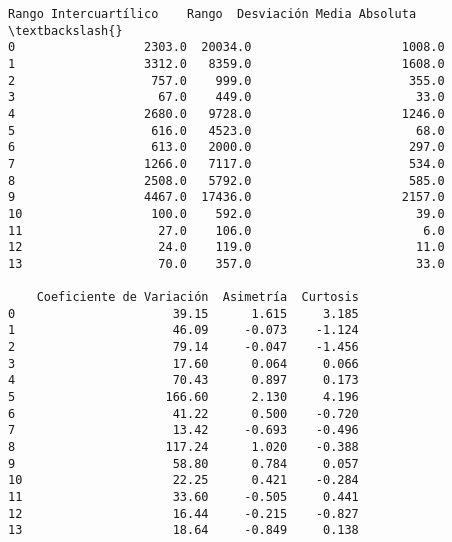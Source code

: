 \documentclass[11pt]{article}
\begin{document}
\begin{tcolorbox}[breakable, size=fbox, boxrule=.5pt, pad at break*=1mm, opacityfill=0]
\begin{Verbatim}[commandchars=\\\{\}]
    Rango Intercuartílico    Rango  Desviación Media Absoluta  \textbackslash{}
0                  2303.0  20034.0                     1008.0
1                  3312.0   8359.0                     1608.0
2                   757.0    999.0                      355.0
3                    67.0    449.0                       33.0
4                  2680.0   9728.0                     1246.0
5                   616.0   4523.0                       68.0
6                   613.0   2000.0                      297.0
7                  1266.0   7117.0                      534.0
8                  2508.0   5792.0                      585.0
9                  4467.0  17436.0                     2157.0
10                  100.0    592.0                       39.0
11                   27.0    106.0                        6.0
12                   24.0    119.0                       11.0
13                   70.0    357.0                       33.0

    Coeficiente de Variación  Asimetría  Curtosis
0                      39.15      1.615     3.185
1                      46.09     -0.073    -1.124
2                      79.14     -0.047    -1.456
3                      17.60      0.064     0.066
4                      70.43      0.897     0.173
5                     166.60      2.130     4.196
6                      41.22      0.500    -0.720
7                      13.42     -0.693    -0.496
8                     117.24      1.020    -0.388
9                      58.80      0.784     0.057
10                     22.25      0.421    -0.284
11                     33.60     -0.505     0.441
12                     16.44     -0.215    -0.827
13                     18.64     -0.849     0.138
\end{Verbatim}
\end{tcolorbox}
        
\end{document}
